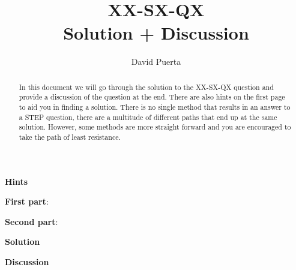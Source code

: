 \documentclass{article}
\title{XX-SX-QX \\ Solution + Discussion}
\author{David Puerta}
\date{}
\begin{document}
\maketitle

\begin{abstract}
    \noindent In this document we will go through the solution to the XX-SX-QX question and provide a discussion of the question at the end. There are also hints on the first page to aid you in finding a solution. There is no single method that results in an answer to a STEP question, there are a multitude of different paths that end up at the same solution. However, some methods are more straight forward and you are encouraged to take the path of least resistance.  
\end{abstract}

\vspace{1cm}

\begin{center}
    \textbf{Hints}
\end{center}

\textbf{First part}:

\vspace{1cm}

\textbf{Second part}: 



\newpage

\begin{center}
    \textbf{Solution}
\end{center}

\vspace{0.5cm}


\newpage

\begin{center}
    \textbf{Discussion}
\end{center}

\vspace{0.5cm}
\end{document}

